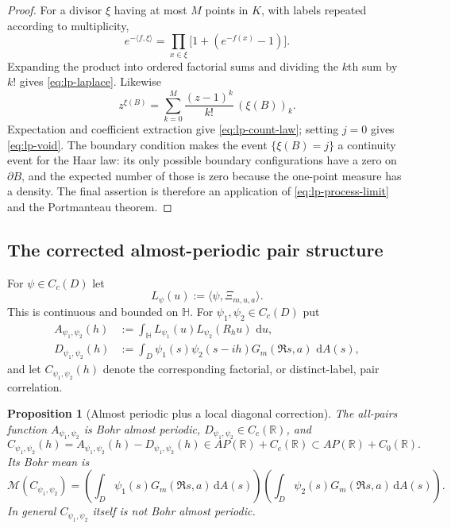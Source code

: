 \documentclass[11pt]{article}
\newtheorem{proposition}[theorem]{Proposition}
\theoremstyle{definition}
\theoremstyle{remark}
\newcommand{\dd}{\,\mathrm d}
\newcommand{\R}{\mathbb R}
\begin{document}
\begin{proof}
For a divisor $\xi$ having at most $M$ points in $K$, with labels repeated
according to multiplicity,
\[
 e^{-\langle f,\xi\rangle}
 =\prod_{x\in\xi}\bigl[1+(e^{-f(x)}-1)\bigr].
\]
Expanding the product into ordered factorial sums and dividing the $k$th sum
by $k!$ gives \eqref{eq:lp-laplace}.  Likewise
\[
 z^{\xi(B)}
 =\sum_{k=0}^{M}\frac{(z-1)^k}{k!}\,(\xi(B))_k.
\]
Expectation and coefficient extraction give \eqref{eq:lp-count-law}; setting
$j=0$ gives \eqref{eq:lp-void}.  The boundary condition makes the event
$\{\xi(B)=j\}$ a continuity event for the Haar law: its only possible boundary
configurations have a zero on $\partial B$, and the expected number of those
is zero because the one-point measure has a density.  The final assertion is
therefore an application of \eqref{eq:lp-process-limit} and the Portmanteau
theorem.
\end{proof}

\subsection{The corrected almost-periodic pair structure}

For $\psi\in C_c(D)$ let
\[
 L_\psi(u):=\langle\psi,\Xi_{m,u,a}\rangle.
\]
This is continuous and bounded on $\mathbb H$.  For
$\psi_1,\psi_2\in C_c(D)$ put
\begin{align}
 A_{\psi_1,\psi_2}(h)
 &:=\int_{\mathbb H}L_{\psi_1}(u)L_{\psi_2}(R_hu)\,\dd u,
 \label{eq:lp-all-pairs}\\
 D_{\psi_1,\psi_2}(h)
 &:=\int_D\psi_1(s)\psi_2(s-ih)
 G_m(\Re s,a)\,\dd A(s),
 \label{eq:lp-diagonal-correction}
\end{align}
and let $C_{\psi_1,\psi_2}(h)$ denote the corresponding factorial, or
distinct-label, pair correlation.

\begin{proposition}[Almost periodic plus a local diagonal correction]
\label{prop:lp-apc0}
The all-pairs function $A_{\psi_1,\psi_2}$ is Bohr almost periodic,
$D_{\psi_1,\psi_2}\in C_c(\R)$, and
\begin{equation}
 \boxed{
 C_{\psi_1,\psi_2}(h)
 =A_{\psi_1,\psi_2}(h)-D_{\psi_1,\psi_2}(h)
 \in AP(\R)+C_c(\R)\subset AP(\R)+C_0(\R).
 }
 \label{eq:lp-apc0}
\end{equation}
Its Bohr mean is
\begin{equation}
 \mathcal M(C_{\psi_1,\psi_2})
 =\left(\int_D\psi_1(s)G_m(\Re s,a)\dd A(s)\right)
  \left(\int_D\psi_2(s)G_m(\Re s,a)\dd A(s)\right).
 \label{eq:lp-pair-mean}
\end{equation}
In general $C_{\psi_1,\psi_2}$ itself is not Bohr almost periodic.
\end{proposition}
\end{document}
